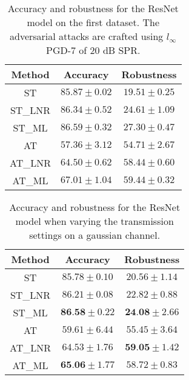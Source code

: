 \documentclass[conference]{IEEEtran}
\begin{document}
\begin{table}[htbp]
	\centering
	\begin{tabular}{c|cc}
	    Method & Accuracy & Robustness \\
		\hline
		ST & $85.87 \pm 0.02$ & $19.51 \pm 0.25$ \\ 
		ST\_LNR & $86.34 \pm 0.52$ & $24.61 \pm 1.09$ \\ 
		ST\_ML & $86.59 \pm 0.32$ & $27.30 \pm 0.47$ \\ 
		AT & $57.36 \pm 3.12$ & $54.71 \pm 2.67$ \\ 
		AT\_LNR & $64.50 \pm 0.62$ & $58.44 \pm 0.60$ \\ 
		AT\_ML & $67.01 \pm 1.04$ & $59.44 \pm 0.32$ \\ 
    \end{tabular}
    \caption{Accuracy and robustness for the ResNet model on the first dataset. The adversarial attacks are crafted using $l_{\infty}$ PGD-7 of 20 dB SPR.}
    \label{tab:sbasic}
\end{table}

\begin{table}[htbp]
	\centering
	\begin{tabular}{c|cc}
	    Method & Accuracy & Robustness \\
		\hline
		ST & $85.78 \pm 0.10$ & $20.56 \pm 1.14$ \\ 
		ST\_LNR & $86.21 \pm 0.08$ & $22.82 \pm 0.88$ \\ 
		ST\_ML & $\textbf{86.58} \pm 0.22$ & $\textbf{24.08} \pm 2.66$ \\
        \hline
		AT & $59.61 \pm 6.44$ & $55.45 \pm 3.64$ \\ 
		AT\_LNR & $64.53 \pm 1.76$ & $\textbf{59.05} \pm 1.42$ \\ 
		AT\_ML & $\textbf{65.06} \pm 1.77$ & $58.72 \pm 0.83$ \\ 
    \end{tabular}
    \caption{Accuracy and robustness for the ResNet model when varying the transmission settings on a gaussian channel.}
    \label{tab:sawgn2p}
\end{table}
\end{document}
